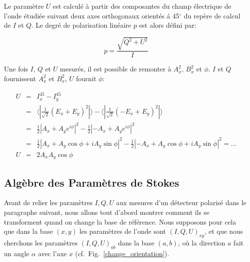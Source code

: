 \documentclass[a4paper,10pt]{article}
\begin{document}
Le param\`{e}tre $U$ est calcul\'{e} \`{a} partir des composantes
du champ \'{e}lectrique de l'onde \'{e}tudi\'{e}e suivant deux
axes orthogonaux orient\'es \'{a} 45$^{\circ}$ du rep\`{e}re de
calcul de $I$ et $Q$. Le degr\'e de polarisation lin\'eaire $p$
est alors d\'efini par:

\begin{equation}
p = \frac{\sqrt{Q^2 + U^2}}{I}\label{degredepola}
\end{equation}

Une fois $I$, $Q$ et $U$ mesur\'{e}s, il est possible de remonter
\`{a} $A_{x}^{2}$, $B_{x}^{2}$ et $\phi$.  $I$ et $Q$ fournissent
$A_{x}^{2}$ et $B_{x}^{2}$, $U$ fournit $\phi$:

\begin{eqnarray}
U & = & I_{x}^{45}-I_{y}^{45}\nonumber\\
  & = & \langle|\frac{1}{\sqrt{2}}(E_{x}+E_{y})^{2}|\rangle-\langle
|\frac{1}{\sqrt{2}}(-E_{x}+E_{y})^{2}|\rangle\nonumber\\
  & = & \frac{1}{2}|A_{x}+A_{y}e^{i\phi}|^{2}
-\frac{1}{2}|-A_{x}+A_{y}e^{i\phi}|^{2}\nonumber \\
  & = & \frac{1}{2}|A_{x}+A_{y}\cos\phi+iA_{y}\sin\phi|^{2}-
\frac{1}{2}|-A_{x}+A_{y}\cos\phi+iA_{y}\sin\phi|^{2}=... \nonumber\\
U & = & 2A_{x}A_{y}\cos\phi
\end{eqnarray}

\subsection{Alg\`ebre des Param\`etres de Stokes}

Avant de relier les param\`etres $I, Q, U$ aux mesures d'un
d\'etecteur polaris\'e dans le paragraphe suivant, nous allons
tout d'abord montrer comment ils se transforment quand on change
la base de r\'ef\'erence. Nous supposons pour cela que dans la
base $(x, y)$ les param\`etres de l'onde sont $(I, Q, U)_{xy}$, et
que nous cherchons les param\`etres $(I, Q, U)_{ab}$ dans la base
$(a, b)$, o\`u la direction $a$ fait un angle $\alpha$ avec l'axe
$x$ (cf.~Fig.~\ref{change_orientation}).
\end{document}
